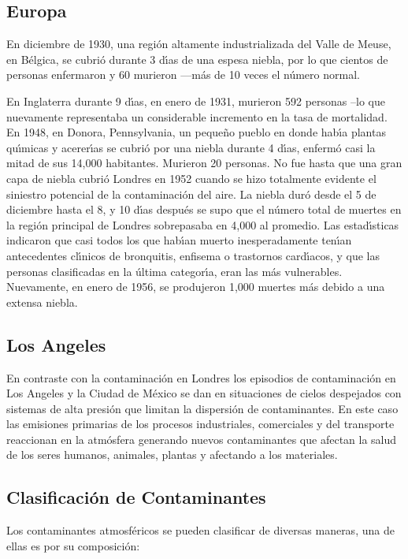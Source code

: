  \subsection{Europa}
En diciembre de 1930, una regi\'on altamente industrializada del Valle de Meuse, en B\'elgica, se cubri\'o durante 3 d\'{\i}as de una espesa niebla, por lo que cientos de personas enfermaron y 60 murieron ---m\'as de 10 veces el n\'umero normal.  

En Inglaterra durante 9 d\'{\i}as, en enero de 1931, murieron 592 personas --lo que nuevamente representaba un considerable incremento en la tasa de mortalidad. En 1948, en Donora, Pennsylvania, un peque\~no pueblo en donde hab\'{\i}a plantas qu\'{\i}micas y acerer\'{\i}as se cubri\'o por una niebla durante 4 d\'{\i}as,  enferm\'o casi la mitad de sus 14,000 habitantes. Murieron 20 personas. No fue hasta que una gran capa de niebla cubri\'o Londres en 1952 cuando se hizo totalmente evidente el siniestro potencial de la contaminaci\'on del aire. La niebla dur\'o desde el 5 de diciembre hasta el 8, y 10 d\'{\i}as despu\'es se supo que el n\'umero total de muertes en la regi\'on principal de Londres sobrepasaba en 4,000 al promedio. Las estad\'{\i}sticas indicaron que casi todos los que hab\'{\i}an muerto inesperadamente ten\'{\i}an antecedentes cl\'{\i}nicos de bronquitis, enfisema o trastornos card\'{\i}acos, y que las personas clasificadas en la \'ultima categor\'{\i}a, eran las m\'as vulnerables. Nuevamente, en enero de 1956, se produjeron 1,000 muertes m\'as debido a una extensa niebla.

 
 \subsection{Los Angeles}
En contraste con la contaminaci\'on en Londres los episodios de contaminaci\'on en Los Angeles y la Ciudad de M\'exico se dan en situaciones de cielos despejados con sistemas de alta presi\'on que limitan la dispersi\'on de contaminantes. En este caso las emisiones primarias de los procesos industriales, comerciales y del transporte reaccionan en la atm\'osfera generando nuevos contaminantes que afectan la salud de los seres humanos, animales, plantas  y afectando a los materiales.

\subsection{Clasificaci\'on de Contaminantes}

Los contaminantes atmosf\'ericos se pueden clasificar de diversas maneras, una de ellas es por su composici\'on:

